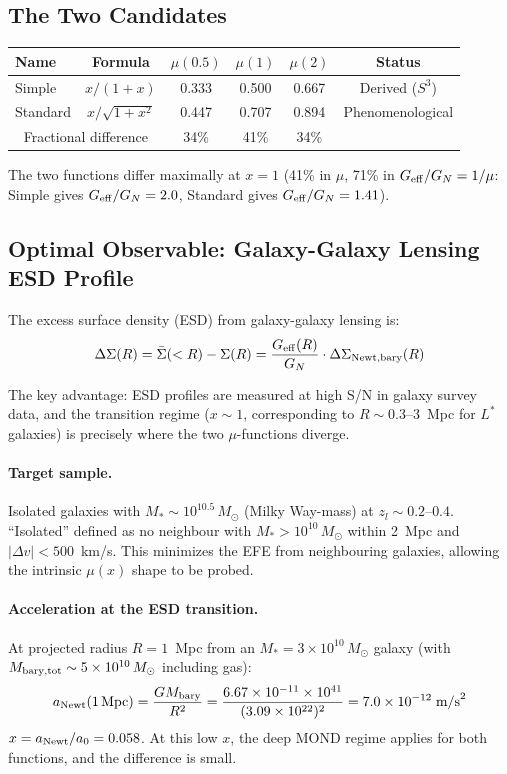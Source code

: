 \documentclass[11pt,a4paper]{article}
\newcommand{\Geff}{G_{\rm eff}}
\newcommand{\ee}[1]{\times 10^{#1}}
\begin{document}
\subsection{The Two Candidates}

\begin{center}
\begin{tabular}{lccccc}
\toprule
Name & Formula & $\mu(0.5)$ & $\mu(1)$ & $\mu(2)$ & Status \\
\midrule
Simple & $x/(1+x)$ & 0.333 & 0.500 & 0.667 & Derived ($S^3$) \\
Standard & $x/\sqrt{1+x^2}$ & 0.447 & 0.707 & 0.894 & Phenomenological \\
\midrule
\multicolumn{2}{c}{Fractional difference} & 34\% & 41\% & 34\% & \\
\bottomrule
\end{tabular}
\end{center}

The two functions differ maximally at $x = 1$ (41\% in $\mu$, 71\% in
$\Geff/G_N = 1/\mu$: Simple gives $\Geff/G_N = 2.0$, Standard gives
$\Geff/G_N = 1.41$).

\subsection{Optimal Observable: Galaxy-Galaxy Lensing ESD Profile}

The excess surface density (ESD) from galaxy-galaxy lensing is:
\begin{equation}
\Delta\Sigma(R) = \bar{\Sigma}(<R) - \Sigma(R)
= \frac{\Geff(R)}{G_N} \cdot \Delta\Sigma_{\rm Newt,bary}(R)
\end{equation}

The key advantage: ESD profiles are measured at high S/N in galaxy survey
data, and the transition regime ($x \sim 1$, corresponding to
$R \sim 0.3$--$3$~Mpc for $L^*$ galaxies) is precisely where the two
$\mu$-functions diverge.

\paragraph{Target sample.}
Isolated galaxies with $M_* \sim 10^{10.5}\,M_\odot$ (Milky Way-mass) at
$z_l \sim 0.2$--$0.4$.  ``Isolated'' defined as no neighbour with
$M_* > 10^{10}\,M_\odot$ within 2~Mpc and $|\Delta v| < 500$~km/s.
This minimizes the EFE from neighbouring galaxies, allowing the intrinsic
$\mu(x)$ shape to be probed.

\paragraph{Acceleration at the ESD transition.}
At projected radius $R = 1$~Mpc from an $M_* = 3 \times 10^{10}\,M_\odot$
galaxy (with $M_{\rm bary,tot} \sim 5 \times 10^{10}\,M_\odot$ including gas):
\begin{equation}
a_{\rm Newt}(1\,\text{Mpc}) = \frac{G M_{\rm bary}}{R^2} = \frac{6.67\ee{-11}
\times 10^{41}}{(3.09\ee{22})^2} = 7.0\ee{-12}\;\text{m/s}^2
\end{equation}
$x = a_{\rm Newt}/a_0 = 0.058$.  At this low $x$, the deep MOND regime applies
for both functions, and the difference is small.
\end{document}

